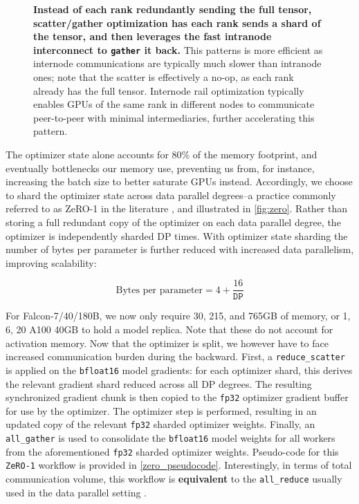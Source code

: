 \documentclass{article}
\DeclareRobustCommand{\hardware}[1]{\textcolor{Mahogany}{#1}}
\begin{document}
\begin{figure}
    \centering
    
    \caption{\textbf{\hardware{Instead of each rank redundantly sending the full tensor, scatter/gather optimization has each rank sends a shard of the tensor, and then leverages the fast intranode interconnect to \texttt{gather} it back.}} This patterns is more efficient as internode communications are typically much slower than intranode ones; note that the scatter is effectively a no-op, as each rank already has the full tensor. Internode rail optimization typically enables GPUs of the same rank in different nodes to communicate peer-to-peer with minimal intermediaries, further accelerating this pattern.}
    \label{fig:scatter_gather}
\end{figure}

The optimizer state alone accounts for 80\% of the memory footprint, and eventually bottlenecks our memory use, preventing us from, for instance, increasing the batch size to better saturate GPUs instead. Accordingly, we choose to shard the optimizer state across data parallel degrees--a practice commonly referred to as ZeRO-1 in the literature \citep{zero-msft}, and illustrated in \cref{fig:zero}. Rather than storing a full redundant copy of the optimizer on each data parallel degree, the optimizer is independently sharded DP times. With optimizer state sharding the number of bytes per parameter is further reduced with increased data parallelism, improving scalability:

\begin{equation}
\text{Bytes per parameter} = 4 + \frac{16}{\texttt{DP}}
\label{zero_mem_usage}
\end{equation}

For Falcon-7/40/180B, we now only require 30, 215, and 765GB of memory, or 1, 6, 20 A100 40GB to hold a model replica. Note that these do not account for activation memory. Now that the optimizer is split, we however have to face increased communication burden during the backward. First, a \texttt{reduce\_scatter} is applied on the \texttt{bfloat16} model gradients: for each optimizer shard, this derives the relevant gradient shard reduced across all DP degrees. The resulting synchronized gradient chunk is then copied to the \texttt{fp32} optimizer gradient buffer for use by the optimizer. The optimizer step is performed, resulting in an updated copy of the relevant \texttt{fp32} sharded optimizer weights. Finally, an \texttt{all\_gather} is used to consolidate the \texttt{bfloat16} model weights for all workers from the aforementioned \texttt{fp32} sharded optimizer weights. Pseudo-code for this \texttt{ZeRO-1} workflow is provided in \cref{zero_pseudocode}. Interestingly, in terms of total communication volume, this workflow is \textbf{equivalent} to the \texttt{all\_reduce} usually used in the data parallel setting \cite{zero-msft}.
\end{document}
